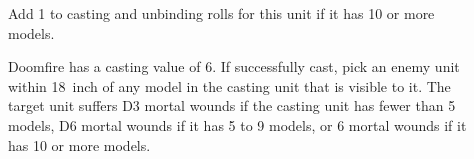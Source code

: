 \newpage %

\begin{description}
    \item [] Add 1 to casting and
        unbinding rolls for this unit if it has 10 or more models.
    \item [] Doomfire has a casting value of 6. If
        successfully cast, pick an enemy unit within 18~inch of any model in
        the casting unit that is visible to it. The target unit suffers D3
        mortal wounds if the casting unit has fewer than 5 models, D6 mortal
        wounds if it has 5 to 9 models, or 6 mortal wounds if it has 10 or more
        models.
\end{description}

